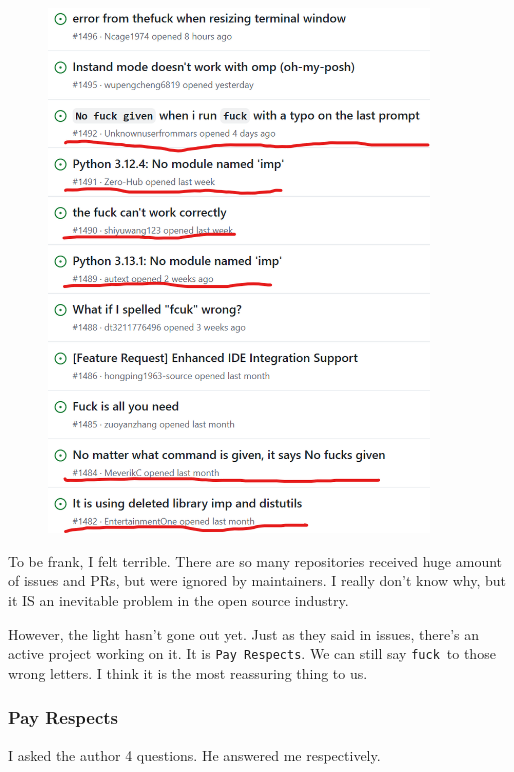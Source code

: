 \documentclass[12pt]{ctexart}
\begin{document}
\begin{figure}[H]
    \centering
    \includegraphics[width=0.9\textwidth,keepaspectratio]{assets/Linux/2.5 What's the first word when messing up a command/3.png}
\end{figure}

To be frank, I felt terrible. There are so many repositories received
huge amount of issues and PRs, but were ignored by maintainers. I really
don't know why, but it IS an inevitable problem in the
open source industry.

However, the light hasn't gone out yet. Just as they
said in issues, there's an active project working on it.
It is \texttt{Pay\ Respects}. We can still say \texttt{fuck}\ to those
wrong letters. I think it is the most reassuring thing to us.

\subsubsection{\textbf{Pay Respects}}

I asked the author 4 questions. He answered me respectively.
\end{document}
